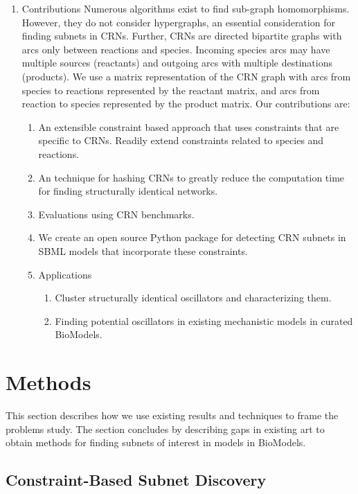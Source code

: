 \documentclass{article}
\begin{document}
\begin{enumerate}
    \item Contributions
    Numerous algorithms exist to find sub-graph homomorphisms. However, they do not consider hypergraphs, an essential consideration for finding subnets in CRNs. Further, CRNs are directed bipartite graphs with arcs only between reactions and species. Incoming species arcs may have multiple sources (reactants) and outgoing arcs with multiple destinations (products). We use a matrix representation of the CRN graph with arcs from species to reactions represented by the reactant matrix, and arcs from reaction to species represented by the product matrix. Our contributions are:
    \begin{enumerate}
        \item An extensible constraint based approach that uses constraints that are specific to CRNs. Readily extend constraints related to species and reactions.
        \item An technique for hashing CRNs to greatly reduce the computation time for finding structurally identical networks.
        \item Evaluations using CRN benchmarks.
        \item We create an open source Python package for detecting CRN subnets in SBML models that incorporate these constraints.
         \item Applications
         \begin{enumerate}
             \item Cluster structurally identical oscillators and characterizing them.
             \item Finding potential oscillators in existing mechanistic models in curated BioModels.
         \end{enumerate}
    \end{enumerate}
    
\end{enumerate}


\section{Methods}
This section describes how we use existing results and techniques to frame the problems study. The section concludes by describing gaps in existing art to obtain methods for finding subnets of interest in models in BioModels.



\subsection{Constraint-Based Subnet Discovery}
\end{document}
